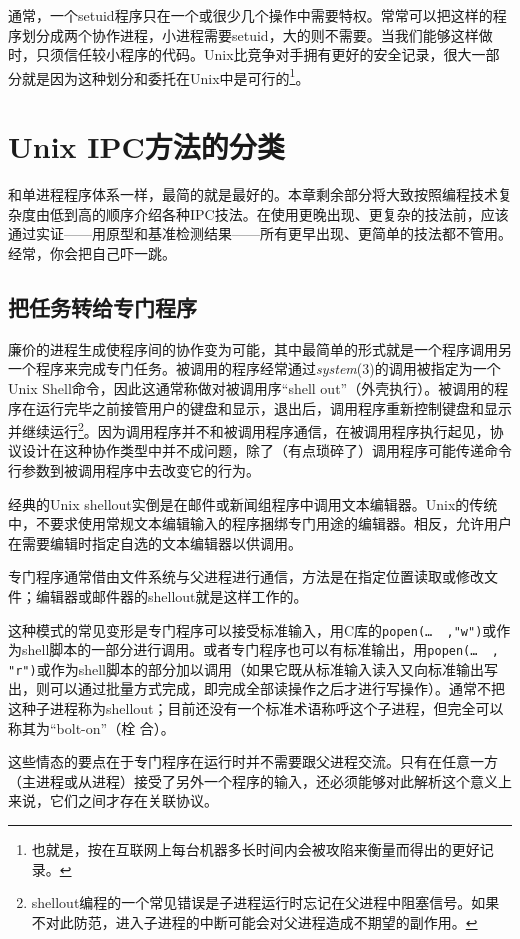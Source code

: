 \documentclass[12pt,oneside]{book}
\begin{document}
\begin{common-format}
通常，一个setuid程序只在一个或很少几个操作中需要特权。常常可以把这样的程序划分成两个协作进程，小进程需要setuid，大的则不需要。当我们能够这样做时，只须信任较小程序的代码。Unix比竞争对手拥有更好的安全记录，很大一部分就是因为这种划分和委托在Unix中是可行的\footnote{也就是，按在互联网上每台机器多长时间内会被攻陷来衡量而得出的更好记录。}。


\section{Unix IPC方法的分类}
和单进程程序体系一样，最简的就是最好的。本章剩余部分将大致按照编程技术复杂度由低到高的顺序介绍各种IPC技法。在使用更晚出现、更复杂的技法前，应该通过实证——用原型和基准检测结果——所有更早出现、更简单的技法都不管用。经常，你会把自己吓一跳。

\subsection{把任务转给专门程序}
廉价的进程生成使程序间的协作变为可能，其中最简单的形式就是一个程序调用另一个程序来完成专门任务。被调用的程序经常通过\textit{system}(3)的调用被指定为一个Unix Shell命令，因此这通常称做对被调用序“shell out”（外壳执行）。被调用的程序在运行完毕之前接管用户的键盘和显示，退出后，调用程序重新控制键盘和显示并继续运行\footnote{shellout编程的一个常见错误是子进程运行时忘记在父进程中阻塞信号。如果不对此防范，进入子进程的中断可能会对父进程造成不期望的副作用。}。因为调用程序并不和被调用程序通信，在被调用程序执行起见，协议设计在这种协作类型中并不成问题，除了（有点琐碎了）调用程序可能传递命令行参数到被调用程序中去改变它的行为。

经典的Unix shellout实倒是在邮件或新闻组程序中调用文本编辑器。Unix的传统中，不要求使用常规文本编辑输入的程序捆绑专门用途的编辑器。相反，允许用户在需要编辑时指定自选的文本编辑器以供调用。

专门程序通常借由文件系统与父进程进行通信，方法是在指定位置读取或修改文件；编辑器或邮件器的shellout就是这样工作的。

这种模式的常见变形是专门程序可以接受标准输入，用C库的\verb+popen(…  ,"w")+或作为shell脚本的一部分进行调用。或者专门程序也可以有标准输出，用\verb+popen(…  , "r")+或作为shell脚本的部分加以调用（如果它既从标准输入读入又向标准输出写出，则可以通过批量方式完成，即完成全部读操作之后才进行写操作）。通常不把这种子进程称为shellout；目前还没有一个标准术语称呼这个子进程，但完全可以称其为“bolt-on”（栓
合）。

这些情态的要点在于专门程序在运行时并不需要跟父进程交流。只有在任意一方（主进程或从进程）接受了另外一个程序的输入，还必须能够对此解析这个意义上来说，它们之间才存在关联协议。


\end{common-format}
\end{document}
